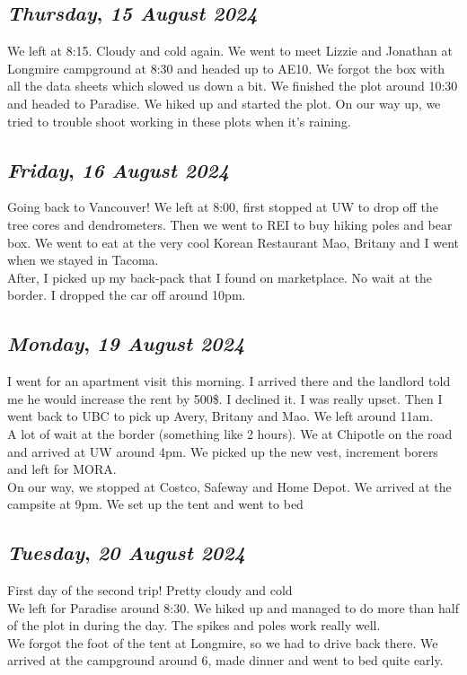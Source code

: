 \def\day{\textit{15 August 2024}}
\def\weekday{\textit{Thursday}}
\subsection*{\weekday, \day}
We left at 8:15. Cloudy and cold again. We went to meet Lizzie and Jonathan at Longmire campground at 8:30 and headed up to AE10. We forgot the box with all the data sheets which slowed us down a bit. We finished the plot around 10:30 and headed to Paradise. We hiked up and started the plot. On our way up, we tried to trouble shoot working in these plots when it's raining.

\def\day{\textit{16 August 2024}}
\def\weekday{\textit{Friday}}
\subsection*{\weekday, \day}
Going back to Vancouver! We left at 8:00, first stopped at UW to drop off the tree cores and dendrometers. Then we went to REI to buy hiking poles and bear box. We went to eat at the very cool Korean Restaurant Mao, Britany and I went when we stayed in Tacoma. \\
After, I picked up my back-pack that I found on marketplace. No wait at the border. I dropped the car off around 10pm. 

\def\day{\textit{19 August 2024}}
\def\weekday{\textit{Monday}}
\subsection*{\weekday, \day}
I went for an apartment visit this morning. I arrived there and the landlord told me he would increase the rent by 500\$. I declined it. I was really upset. Then I went back to UBC to pick up Avery, Britany and Mao. We left around 11am. \\
A lot of wait at the border (something like 2 hours). We at Chipotle on the road and arrived at UW around 4pm. We picked up the new vest, increment borers and left for MORA. \\ 
On our way, we stopped at Costco, Safeway and Home Depot. 
We arrived at the campsite at 9pm. We set up the tent and went to bed

\def\day{\textit{20 August 2024}}
\def\weekday{\textit{Tuesday}}
\subsection*{\weekday, \day}
First day of the second trip! Pretty cloudy and cold\\
We left for Paradise around 8:30. We hiked up and managed to do more than half of the plot in during the day. The spikes and poles work really well.\\
We forgot the foot of the tent at Longmire, so we had to drive back there. We arrived at the campground around 6, made dinner and went to bed quite early.

